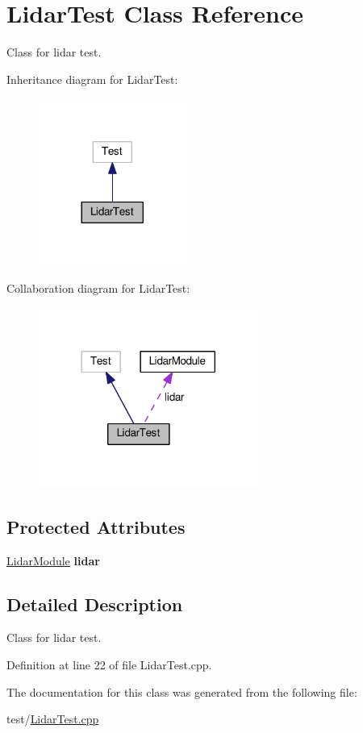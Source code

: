 \hypertarget{class_lidar_test}{}\section{Lidar\+Test Class Reference}
\label{class_lidar_test}


Class for lidar test.  




Inheritance diagram for Lidar\+Test\+:
\nopagebreak
\begin{figure}[H]
\begin{center}
\leavevmode
\includegraphics[width=137pt]{class_lidar_test__inherit__graph}
\end{center}
\end{figure}


Collaboration diagram for Lidar\+Test\+:
\nopagebreak
\begin{figure}[H]
\begin{center}
\leavevmode
\includegraphics[width=204pt]{class_lidar_test__coll__graph}
\end{center}
\end{figure}
\subsection*{Protected Attributes}
\begin{DoxyCompactItemize}
\item 
\hyperlink{class_lidar_module}{Lidar\+Module} {\bfseries lidar}\hypertarget{class_lidar_test_ab19e318f3d99df132e015dd8c77c4898}{}\label{class_lidar_test_ab19e318f3d99df132e015dd8c77c4898}

\end{DoxyCompactItemize}


\subsection{Detailed Description}
Class for lidar test. 

Definition at line 22 of file Lidar\+Test.\+cpp.



The documentation for this class was generated from the following file\+:\begin{DoxyCompactItemize}
\item 
test/\hyperlink{_lidar_test_8cpp}{Lidar\+Test.\+cpp}\end{DoxyCompactItemize}
